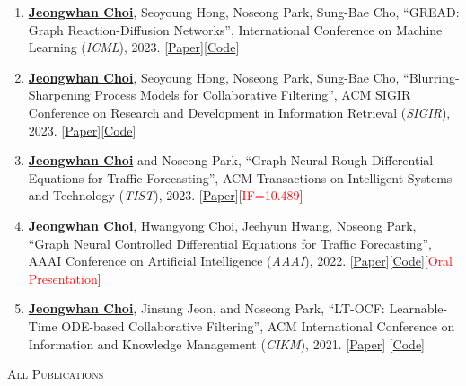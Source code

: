 \documentclass[10pt]{article}
\newenvironment{changemargin}[2]{
  \begin{list}{}{
    \setlength{\topsep}{0pt}
    \setlength{\leftmargin}{#1}
    \setlength{\rightmargin}{#2}
    \setlength{\listparindent}{\parindent}
    \setlength{\itemindent}{\parindent}
    \setlength{\parsep}{\parskip}
  }
  \item[]}{\end{list}
}
\newcommand{\lineover}{
	\begin{changemargin}{-0.05in}{-0.05in}
		\vspace*{-8pt}
		\hrulefill \\
		\vspace*{-2pt}
	\end{changemargin}
}
\newcommand{\header}[1]{
	\begin{changemargin}{-0.5in}{-0.5in}
		\scshape{#1}\\
  	\lineover
	\end{changemargin}
}
\newcommand{\RED}[1]{\textcolor{red}{#1}}
\newcommand{\textbu}[1]{\underline{\textbf{#1}}}
\newenvironment{body} {
	\vspace*{-16pt}
	\begin{changemargin}{-0.25in}{-0.5in}
  }
	{\end{changemargin}
}
\begin{document}
\begin{body}
\begin{enumerate}
    \item \textbu{Jeongwhan Choi}, Seoyoung Hong, Noseong Park, Sung-Bae Cho, ``GREAD: Graph Reaction-Diffusion Networks'', International Conference on Machine Learning (\textit{ICML}), 2023. [\href{http://proceedings.mlr.press/v202/choi23a}{Paper}][\href{https://github.com/jeongwhanchoi/GREAD}{Code}]
    \item \textbu{Jeongwhan Choi}, Seoyoung Hong, Noseong Park, Sung-Bae Cho, ``Blurring-Sharpening Process Models for Collaborative Filtering'', ACM SIGIR Conference on Research and Development in Information Retrieval (\textit{SIGIR}), 2023. [\href{https://arxiv.org/abs/2211.09324}{Paper}][\href{https://github.com/jeongwhanchoi/bspm}{Code}]
    \item \textbu{Jeongwhan Choi} and Noseong Park, ``Graph Neural Rough Differential Equations for Traffic Forecasting'', ACM Transactions on Intelligent Systems and Technology (\textit{TIST}), 2023. [\href{https://dl.acm.org/doi/abs/10.1145/3604808}{Paper}][\RED{IF=10.489}]
    \item \textbu{Jeongwhan Choi}, Hwangyong Choi, Jeehyun Hwang, Noseong Park, ``Graph Neural Controlled Differential Equations for Traffic Forecasting'', AAAI Conference on Artificial Intelligence (\textit{AAAI}), 2022. [\href{https://ojs.aaai.org/index.php/AAAI/article/download/20587/20346}{Paper}][\href{https://github.com/jeongwhanchoi/STG-NCDE}{Code}][\RED{Oral Presentation}] 
    \item \textbu{Jeongwhan Choi}, Jinsung Jeon, and Noseong Park, ``LT-OCF: Learnable-Time ODE-based Collaborative Filtering'', ACM International Conference on Information and Knowledge Management (\textit{CIKM}), 2021. [\href{https://arxiv.org/pdf/2108.06208.pdf}{Paper}] [\href{https://github.com/jeongwhanchoi/LT-OCF}{Code}] 
\end{enumerate}
\end{body}
\vspace{14pt}

\header{All Publications}
\end{document}
